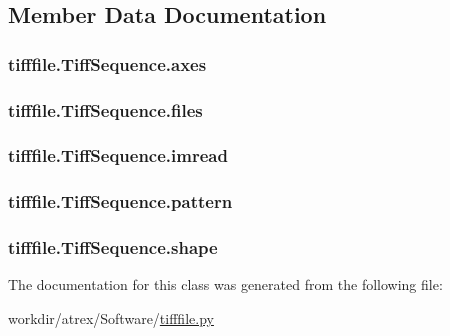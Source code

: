 \subsection{Member Data Documentation}
\hypertarget{classtifffile_1_1_tiff_sequence_af80218f30eebb11ff3054df126b5e800}{
\subsubsection[{axes}]{\setlength{\rightskip}{0pt plus 5cm}tifffile.\-Tiff\-Sequence.\-axes}}\label{classtifffile_1_1_tiff_sequence_af80218f30eebb11ff3054df126b5e800}
\hypertarget{classtifffile_1_1_tiff_sequence_a734d6dfdbfbdc2d26c59e7413e9f78d4}{
\subsubsection[{files}]{\setlength{\rightskip}{0pt plus 5cm}tifffile.\-Tiff\-Sequence.\-files}}\label{classtifffile_1_1_tiff_sequence_a734d6dfdbfbdc2d26c59e7413e9f78d4}
\hypertarget{classtifffile_1_1_tiff_sequence_a656d87f405cb67c7744470bef749c09d}{
\subsubsection[{imread}]{\setlength{\rightskip}{0pt plus 5cm}tifffile.\-Tiff\-Sequence.\-imread}}\label{classtifffile_1_1_tiff_sequence_a656d87f405cb67c7744470bef749c09d}
\hypertarget{classtifffile_1_1_tiff_sequence_a3ced8e56728d8dc84b95cd0e28dd8b29}{
\subsubsection[{pattern}]{\setlength{\rightskip}{0pt plus 5cm}tifffile.\-Tiff\-Sequence.\-pattern}}\label{classtifffile_1_1_tiff_sequence_a3ced8e56728d8dc84b95cd0e28dd8b29}
\hypertarget{classtifffile_1_1_tiff_sequence_ae581d8715f29b3c6d03df21d139d68c9}{
\subsubsection[{shape}]{\setlength{\rightskip}{0pt plus 5cm}tifffile.\-Tiff\-Sequence.\-shape}}\label{classtifffile_1_1_tiff_sequence_ae581d8715f29b3c6d03df21d139d68c9}


The documentation for this class was generated from the following file\-:\begin{DoxyCompactItemize}
\item 
workdir/atrex/\-Software/\hyperlink{tifffile_8py}{tifffile.\-py}\end{DoxyCompactItemize}
